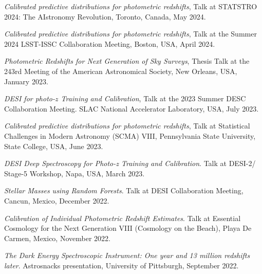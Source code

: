 
 \begin{etaremune}[leftmargin=40pt,labelsep=10pt]
 
     \item \textit{Calibrated predictive distributions for photometric redshifts}, Talk at STATSTRO 2024: The AIstronomy Revolution, Toronto, Canada, May 2024.
    \item \textit{Calibrated predictive distributions for photometric redshifts}, Talk at the Summer 2024 LSST-ISSC Collaboration Meeting, Boston, USA, April 2024.
    \item \textit{Photometric Redshifts for Next Generation of Sky Surveys}, Thesis Talk at the 243rd Meeting of the American Astronomical Society, New Orleans, USA, January 2023.
    \item \textit{DESI for photo-$z$ Training and Calibration}, Talk at the 2023 Summer DESC Collaboration Meeting. SLAC National Accelerator Laboratory, USA, July 2023.
    \item \textit{Calibrated predictive distributions for photometric redshifts}, Talk at Statistical Challenges in Modern Astronomy (SCMA) VIII, Pennsylvania State University, State College, USA, June 2023.
    \item \textit{DESI Deep Spectroscopy for Photo-z Training and Calibration}. Talk at DESI-2/ Stage-5 Workshop, Napa, USA, March 2023.
    \item \textit{Stellar Masses using Random Forests}. Talk at DESI Collaboration Meeting, Cancun, Mexico, December 2022.
    \item \textit{Calibration of Individual Photometric Redshift Estimates}. Talk at Essential Cosmology for the Next Generation VIII (Cosmology on the Beach), Playa De Carmen, Mexico, November 2022.
    \item \textit{The Dark Energy Spectroscopic Instrument: One year and 13 million redshifts later}. Astrosnacks presentation, University of Pittsburgh, September 2022.

\end{etaremune}
